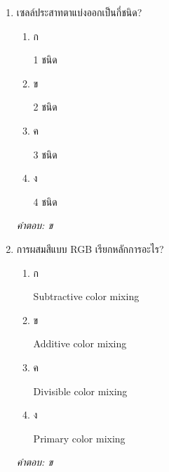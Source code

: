 \documentclass[12pt]{article}
\begin{document}
\begin{enumerate}[label=\arabic*., itemsep=0.5\baselineskip, topsep=0.5\baselineskip, leftmargin=*]
\item เซลล์ประสาทตาแบ่งออกเป็นกี่ชนิด?
\begin{enumerate}[label=\alph*)., itemsep=0.3\baselineskip, topsep=0.3\baselineskip]
\item ก\ 
\begin{minipage}[t]{0.9\linewidth}
\raggedright 1 ชนิด
\end{minipage}
\item ข\ 
\begin{minipage}[t]{0.9\linewidth}
\raggedright 2 ชนิด
\end{minipage}
\item ค\ 
\begin{minipage}[t]{0.9\linewidth}
\raggedright 3 ชนิด
\end{minipage}
\item ง\ 
\begin{minipage}[t]{0.9\linewidth}
\raggedright 4 ชนิด
\end{minipage}
\end{enumerate}
\vspace{-0.3\baselineskip}
\begin{small}
\textit{คำตอบ: ข}
\end{small}

\item การผสมสีแบบ RGB เรียกหลักการอะไร?
\begin{enumerate}[label=\alph*)., itemsep=0.3\baselineskip, topsep=0.3\baselineskip]
\item ก\ 
\begin{minipage}[t]{0.9\linewidth}
\raggedright Subtractive color mixing
\end{minipage}
\item ข\ 
\begin{minipage}[t]{0.9\linewidth}
\raggedright Additive color mixing
\end{minipage}
\item ค\ 
\begin{minipage}[t]{0.9\linewidth}
\raggedright Divisible color mixing
\end{minipage}
\item ง\ 
\begin{minipage}[t]{0.9\linewidth}
\raggedright Primary color mixing
\end{minipage}
\end{enumerate}
\vspace{-0.3\baselineskip}
\begin{small}
\textit{คำตอบ: ข}
\end{small}


\end{enumerate}
\end{document}
